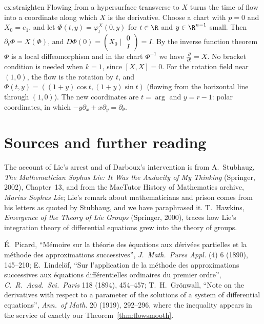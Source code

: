 \begin{solution}{ex:straighten}
\idea Flowing from a hypersurface transverse to $X$ turns the time of flow into a coordinate along which $X$ is the derivative.
\writeup Choose a chart with $p=0$ and $X_0=e_1$, and let $\Phi(t,y)=\varphi^X_t(0,y)$ for $t\in\R$ and $y\in\R^{n-1}$ small. Then $\partial_t\Phi=X(\Phi)$, and
$D\Phi(0)=(X_0\mid\begin{smallmatrix}0\\ I\end{smallmatrix})=I$. By the inverse function theorem $\Phi$ is a local diffeomorphism and in the chart $\Phi^{-1}$ we have
$\frac\partial{\partial t}=X$. No bracket condition is needed when $k=1$, since $[X,X]=0$. For the rotation field near $(1,0)$, the flow is the rotation by $t$, and
$\Phi(t,y)=((1+y)\cos t,(1+y)\sin t)$ (flowing from the horizontal line through $(1,0)$). The new coordinates are $t=\arg$ and $y=r-1$: polar coordinates,
in which $-y\partial_x+x\partial_y=\partial_\theta$.
\end{solution}

\section*{Sources and further reading}

The account of Lie's arrest and of Darboux's intervention is from A.~Stubhaug, \emph{The Mathematician Sophus Lie: It Was the Audacity of My Thinking}
(Springer, 2002), Chapter~13, and from the MacTutor History of Mathematics archive, \emph{Marius Sophus Lie}; Lie's remark about mathematicians and
prison comes from his letters as quoted by Stubhaug, and we have paraphrased it. T.~Hawkins, \emph{Emergence of the Theory of Lie Groups} (Springer, 2000), traces how Lie's
integration theory of differential equations grew into the theory of groups.

\'E.~Picard, ``M\'emoire sur la th\'eorie des \'equations aux d\'eriv\'ees partielles et la m\'ethode des approximations successives'', \emph{J.\ Math.\
Pures Appl.} (4) 6 (1890), 145--210; E.~Lindel\"of, ``Sur l'application de la m\'ethode des approximations successives aux \'equations diff\'erentielles
ordinaires du premier ordre'', \emph{C.\ R.\ Acad.\ Sci.\ Paris} 118 (1894), 454--457; T.~H.~Gr\"onwall, ``Note on the derivatives with respect to a
parameter of the solutions of a system of differential equations'', \emph{Ann.\ of Math.} 20 (1919), 292--296, where the inequality appears in the service
of exactly our Theorem~\ref{thm:flowsmooth}.

